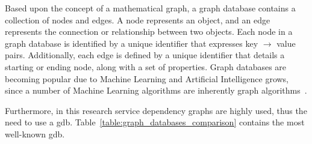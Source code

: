 \newpage

Based upon the concept of a mathematical graph, a graph database contains a collection of nodes and edges. A node represents an object, and an edge represents the connection or relationship between two objects. Each node in a graph database is identified by a unique identifier that expresses key $\rightarrow$ value pairs. Additionally, each edge is defined by a unique identifier that details a starting or ending node, along with a set of properties. Graph databases are becoming popular due to Machine Learning and Artificial Intelligence grows, since a number of Machine Learning algorithms are inherently graph algorithms~\cite{FavioVazquez2019}.

Furthermore, in this research service dependency graphs are highly used, thus the need to use a \gls{gdb}. Table~\ref{table:graph_databases_comparison} contains the most well-known \gls{gdb}.

